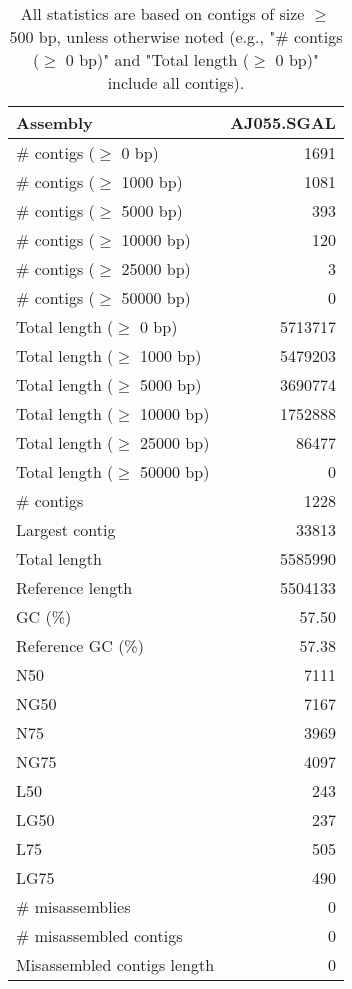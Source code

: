 \documentclass[12pt,a4paper]{article}
\begin{document}
\begin{table}[ht]
\begin{center}
\caption{All statistics are based on contigs of size $\geq$ 500 bp, unless otherwise noted (e.g., "\# contigs ($\geq$ 0 bp)" and "Total length ($\geq$ 0 bp)" include all contigs).}
\begin{tabular}{|l*{1}{|r}|}
\hline
Assembly & AJ055.SGAL \\ \hline
\# contigs ($\geq$ 0 bp) & 1691 \\ \hline
\# contigs ($\geq$ 1000 bp) & 1081 \\ \hline
\# contigs ($\geq$ 5000 bp) & 393 \\ \hline
\# contigs ($\geq$ 10000 bp) & 120 \\ \hline
\# contigs ($\geq$ 25000 bp) & 3 \\ \hline
\# contigs ($\geq$ 50000 bp) & 0 \\ \hline
Total length ($\geq$ 0 bp) & 5713717 \\ \hline
Total length ($\geq$ 1000 bp) & 5479203 \\ \hline
Total length ($\geq$ 5000 bp) & 3690774 \\ \hline
Total length ($\geq$ 10000 bp) & 1752888 \\ \hline
Total length ($\geq$ 25000 bp) & 86477 \\ \hline
Total length ($\geq$ 50000 bp) & 0 \\ \hline
\# contigs & 1228 \\ \hline
Largest contig & 33813 \\ \hline
Total length & 5585990 \\ \hline
Reference length & 5504133 \\ \hline
GC (\%) & 57.50 \\ \hline
Reference GC (\%) & 57.38 \\ \hline
N50 & 7111 \\ \hline
NG50 & 7167 \\ \hline
N75 & 3969 \\ \hline
NG75 & 4097 \\ \hline
L50 & 243 \\ \hline
LG50 & 237 \\ \hline
L75 & 505 \\ \hline
LG75 & 490 \\ \hline
\# misassemblies & 0 \\ \hline
\# misassembled contigs & 0 \\ \hline
Misassembled contigs length & 0 \\ \hline

\end{tabular}
\end{center}
\end{table}
\end{document}
